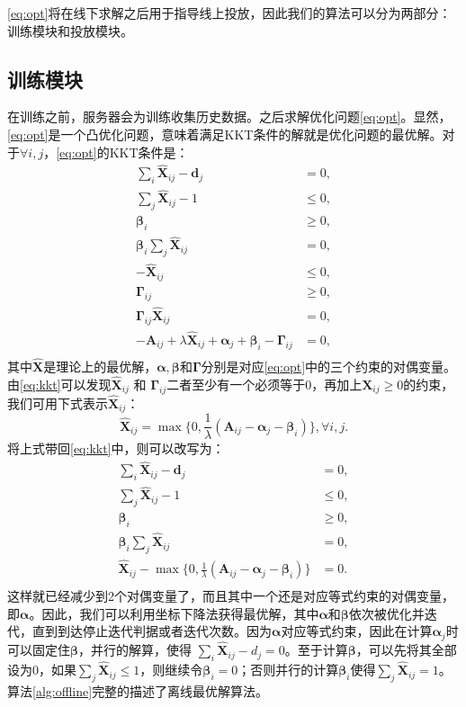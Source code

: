 \eqref{eq:opt}将在线下求解之后用于指导线上投放，因此我们的算法可以分为两部分：训练模块和投放模块。

\subsection{训练模块} \label{subsec:train}

在训练之前，服务器会为训练收集历史数据。之后求解优化问题\eqref{eq:opt}。显然，\eqref{eq:opt}是一个凸优化问题，意味着满足KKT条件的解就是优化问题的最优解。对于$\forall i,j$，\eqref{eq:opt}的KKT条件是：
\begin{equation}
\begin{aligned}
\sum_i{\bm{\hat{X}}_{ij}} - \bm{d}_j &= 0, \\
\sum_j{\bm{\hat{X}}_{ij}} -1 &\le 0, \\
\bm{\beta}_i &\ge 0, \\
\bm{\beta}_i\sum_j \bm{\hat{X}}_{ij} &= 0, \\
-\bm{\hat{X}}_{ij} &\le 0, \\
\bm{\Gamma}_{ij} &\ge 0, \\
\bm{\Gamma}_{ij}\bm{\hat{X}}_{ij} &= 0, \\
-\bm{A}_{ij} + \lambda\bm{\hat{X}}_{ij} + \bm{\alpha}_j + \bm{\beta}_i - \bm{\Gamma}_{ij} &= 0, \\ 
\label{eq:kkt}
\end{aligned}
\end{equation}
其中$\bm{\hat{X}}$是理论上的最优解，$\bm{\alpha}, \bm{\beta}$和$\bm{\Gamma}$分别是对应\eqref{eq:opt}中的三个约束的对偶变量。由\eqref{eq:kkt}可以发现$\bm{\hat{X}}_{ij}$ 和 $\bm{\Gamma}_{ij}$二者至少有一个必须等于0，再加上$\bm{X}_{ij} \ge 0$的约束，我们可用下式表示$\bm{\hat{X}}_{ij}$：
\begin{equation}
\bm{\hat{X}}_{ij} = \max\{0, \frac{1}{\lambda} (\bm{A}_{ij} - \bm{\alpha}_j - \bm{\beta}_i)\}, \forall i, j. 
\label{eq:xeq}
\end{equation}
将上式带回\eqref{eq:kkt}中，则可以改写为：
\begin{equation}
\begin{aligned}
\sum_i{\bm{\hat{X}}_{ij}} - \bm{d}_j &= 0, \\
\sum_j{\bm{\hat{X}}_{ij}} - 1 &\le 0, \\
\bm{\beta}_i &\ge 0, \\
\bm{\beta}_i\sum_j \bm{\hat{X}}_{ij} &= 0, \\
\bm{\hat{X}}_{ij} - \max\{0, \frac{1}{\lambda} (\bm{A}_{ij} - \bm{\alpha}_j - \bm{\beta}_i)\} &= 0. \\ 
\end{aligned}
\end{equation}
这样就已经减少到2个对偶变量了，而且其中一个还是对应等式约束的对偶变量，即$\bm{\alpha}$。因此，我们可以利用坐标下降法获得最优解，其中$\bm{\alpha}$和$\bm{\beta}$依次被优化并迭代，直到到达停止迭代判据或者迭代次数。因为$\bm{\alpha}$对应等式约束，因此在计算$\bm{\alpha}_j$时可以固定住$\bm{\beta}$，并行的解算，使得 $\sum_i{\bm{\hat{X}}_{ij}} - d_j = 0$。至于计算$\bm{\beta}$，可以先将其全部设为0，如果$\sum_j{\bm{\hat{X}}_{ij}} \le 1$，则继续令$\bm{\beta}_i=0$；否则并行的计算$\bm{\beta}_i$使得$\sum_j{\bm{\hat{X}}_{ij}} = 1$。算法\ref{alg:offline}完整的描述了离线最优解算法。

